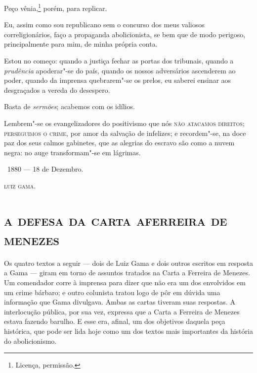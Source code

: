Peço vênia,\footnote{Licença, permissão.}
porém, para replicar.

Eu, assim como sou republicano sem o concurso dos meus valiosos
correligionários, faço a propaganda abolicionista, se bem que de modo
perigoso, principalmente para mim, de minha própria conta.

Estou no começo: quando a justiça fechar as portas dos tribunais, quando
a \emph{prudência} apoderar"-se do país, quando os nossos adversários
ascenderem ao poder, quando da imprensa quebrarem"-se os prelos, eu
saberei ensinar aos desgraçados a vereda do desespero.

Basta de \emph{sermões}; acabemos com os idílios.

Lembrem"-se os evangelizadores do positivismo que nós \textsc{não atacamos
direitos; perseguimos o crime}, por amor da salvação de infelizes; e
recordem"-se, na doce paz dos seus calmos gabinetes, que as alegrias do
escravo são como a nuvem negra: no auge transformam"-se em lágrimas.

\bigskip

\hfill\ 1880 --- 18 de Dezembro.\medskip


\hfill\textsc{luiz gama.}



\begingroup\makeatletter\@openrightfalse
\part[a defesa da carta a ferreira de menezes]{\textsc{a defesa da carta a\break ferreira de menezes}}

\pagebreak
\mbox{}\vfill
\thispagestyle{empty}

{\small\noindent
Os quatro textos a seguir --- dois de Luiz Gama e dois outros
escritos em resposta a Gama --- giram em torno de assuntos tratados na
Carta a Ferreira de Menezes. Um comendador corre à imprensa para dizer
que não era um dos envolvidos em um crime bárbaro; e outro colunista
tratou logo de pôr em dúvida uma informação que Gama divulgava. Ambas as
cartas tiveram suas respostas. A interlocução pública, por sua vez,
expressa que a Carta a Ferreira de Menezes estava fazendo barulho. E
esse era, afinal, um dos objetivos daquela peça histórica, que pode ser
lida hoje como um dos textos mais importantes da história do
abolicionismo.}
\@openrighttrue\makeatother\endgroup

\paginabranca
\mbox{}\vfill
\thispagestyle{empty}

